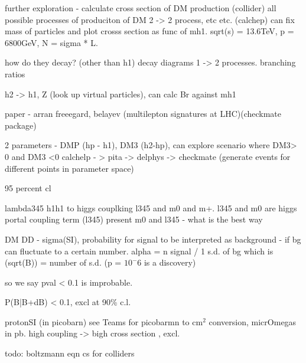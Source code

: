 \documentclass[11pt,a4paper]{article}
\begin{document}
further exploration - calculate cross section of DM production (collider)
all possible processes of produciton of DM 2 -> 2 process, etc etc. (calchep)
can fix mass of particles and plot crosss section as func of mh1.
sqrt(s) = 13.6TeV, p = 6800GeV, N = sigma * L. 

how do they decay? (other than h1)
decay diagrams 1 -> 2 processes.
branching ratios

h2 -> h1, Z (look up virtual particles), can calc Br against mh1

paper - arran freeegard, belayev (multilepton signatures at LHC)(checkmate package)

2 parameters - DMP (hp - h1), DM3 (h2-hp), can explore scenario where DM3> 0 and DM3 <0
calchelp - > pita -> delphys -> checkmate (generate events for different points in parameter space)

95 percent cl

lambda345 h1h1 to higgs couplking
l345 and m0 and m+. l345 and m0 are higgs portal coupling term (l345)
present m0 and l345 - what is the best way

DM DD - sigma(SI), probability for signal to be interpreted as background - if bg can fluctuate to a certain number.
alpha = n signal / 1 s.d. of bg which is (sqrt(B)) = number of s.d. (p = $10^-6$ is a discovery)

so we say pval < 0.1 is improbable.

P(B|B+dB) < 0.1, excl at 90\% c.l.

protonSI (in picobarn) see Teams for picobarmn to cm$^2$ conversion, micrOmegas in pb. high coupling -> bigh cross section , excl. 

todo:
boltzmann eqn
cs for colliders
\end{document}
